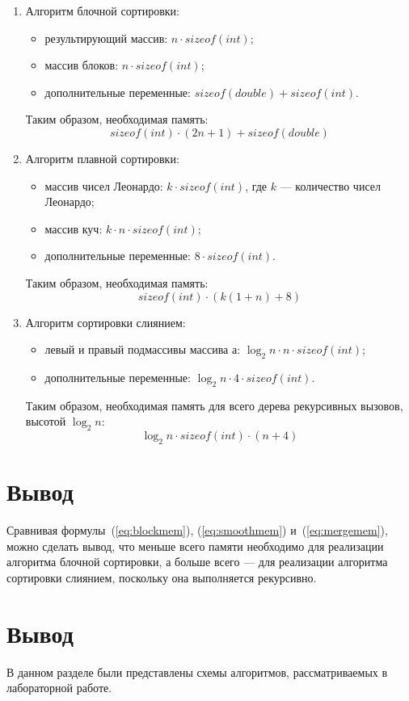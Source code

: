 \begin{enumerate}
	\item Алгоритм блочной сортировки:
	\begin{itemize}[label=---]
		\item результирующий массив: $n \cdot sizeof(int)$;
		\item массив блоков: $n \cdot sizeof(int)$;
		\item дополнительные переменные: $sizeof(double) + sizeof(int)$.
	\end{itemize}
	
	Таким образом, необходимая память: %
	\begin{equation}
		\label{eq:blockmem}
		sizeof(int) \cdot (2n + 1) + sizeof(double)
	\end{equation}
	
	\item Алгоритм плавной сортировки:
	\begin{itemize}[label=---]
		\item массив чисел Леонардо: $k \cdot sizeof(int)$, где $k$ --- количество чисел Леонардо;
		\item массив куч: $k \cdot n \cdot sizeof(int)$;
		\item дополнительные переменные: $8 \cdot sizeof(int)$.
	\end{itemize}
	
	Таким образом, необходимая память: %
	\begin{equation}
		\label{eq:smoothmem}
		sizeof(int) \cdot (k(1 + n) + 8)
	\end{equation}
	
	\item Алгоритм сортировки слиянием:
	\begin{itemize}[label=---]
		\item левый и правый подмассивы массива а: $\log_2n \cdot n \cdot sizeof(int)$;
		\item дополнительные переменные: $\log_2n \cdot 4 \cdot sizeof(int)$.
	\end{itemize}
	
	Таким образом, необходимая память для всего дерева рекурсивных вызовов, высотой $\log_2n$: %
	\begin{equation}
		\label{eq:mergemem}
		\log_2n \cdot sizeof(int) \cdot (n + 4)
	\end{equation}
\end{enumerate}

\section*{Вывод}

Сравнивая формулы~(\ref{eq:blockmem}), (\ref{eq:smoothmem}) и~(\ref{eq:mergemem}), можно сделать вывод, что меньше всего памяти необходимо для реализации алгоритма блочной сортировки, а больше всего --- для реализации алгоритма сортировки слиянием, поскольку она выполняется рекурсивно.

\section{Вывод}

В данном разделе были представлены схемы алгоритмов, рассматриваемых в лабораторной работе.